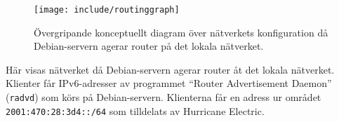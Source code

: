 \begin{figure}[H]
  \centering
  \texttt{[image: include/routinggraph]}
  \caption[Diagram över nätverkets konfiguration.]
          {Övergripande konceptuellt diagram över nätverkets konfiguration då
           Debian-servern agerar router på det lokala nätverket.}
  \label{fig:routinggraph}
\end{figure}

Här visas nätverket då Debian-servern agerar router åt det lokala nätverket.
Klienter får IPv6-adresser av programmet ``Router Advertisement Daemon''
(\texttt{radvd}) \cite{ipv6:radvd} som körs på Debian-servern.  Klienterna får
en adress ur området \texttt{2001:470:28:3d4::/64} som tilldelats av Hurricane
Electric.

